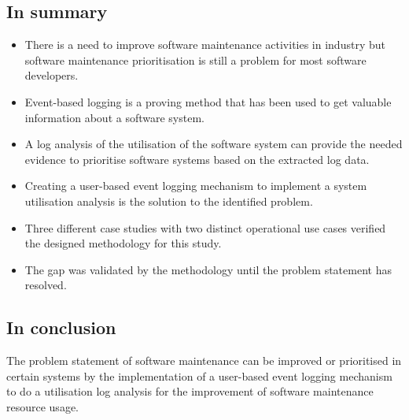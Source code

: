\subsection{In summary}
\begin{itemize}
	\item There is a need to improve software maintenance activities in industry but software maintenance prioritisation is still a problem for most software developers.
	\item Event-based logging is a proving method that has been used to get valuable information about a software system.
	\item A log analysis of the utilisation of the software system can provide the needed evidence to prioritise software systems based on the extracted log data.
	\item Creating a user-based event logging mechanism to implement a system utilisation analysis is the solution to the identified problem.
	\item Three different case studies with two distinct operational use cases verified the designed methodology for this study.
	\item The gap was validated by the methodology until the problem statement has resolved.
\end{itemize}

\subsection{In conclusion}
The problem statement of software maintenance can be improved or prioritised in certain systems by the implementation of a user-based event logging mechanism to do a utilisation log analysis for the improvement of software maintenance resource usage.